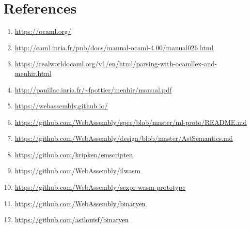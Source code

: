 \documentclass{article}
\begin{document}
\section{References}
\begin{enumerate}
  \item \url{https://ocaml.org/}
  \item \url{http://caml.inria.fr/pub/docs/manual-ocaml-4.00/manual026.html}
  \item \url{https://realworldocaml.org/v1/en/html/parsing-with-ocamllex-and-menhir.html}
  \item \url{http://pauillac.inria.fr/~fpottier/menhir/manual.pdf}
  \item \url{https://webassembly.github.io/}
  \item \url{https://github.com/WebAssembly/spec/blob/master/ml-proto/README.md}
  \item \url{https://github.com/WebAssembly/design/blob/master/AstSemantics.md}
  \item \url{https://github.com/kripken/emscripten}
  \item \url{https://github.com/WebAssembly/ilwasm}
  \item \url{https://github.com/WebAssembly/sexpr-wasm-prototype}
  \item \url{https://github.com/WebAssembly/binaryen}
  \item \url{https://github.com/astlouisf/binaryen}
\end{enumerate}
\end{document}
